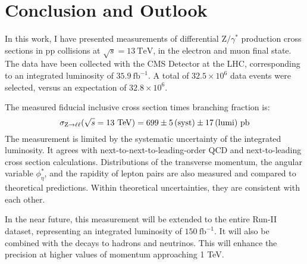 \chapter{Conclusion and Outlook}

In this work, I have presented measurements of differential $\mathrm{Z}/\gamma^{*}$ production cross sections in $\mathrm{p}\mathrm{p}$ collisions at $\sqrt{s}=13~\mathrm{TeV}$,
in the electron and muon final state.
The data have been collected with the CMS Detector at the LHC, corresponding to an integrated luminosity of $35.9~\mathrm{fb}^{-1}$.
A total of $32.5 \times 10^{6}$ data events were selected, versus an expectation of $32.8 \times 10^{6}$.

The measured fiducial inclusive cross section times branching fraction is: 
\begin{equation*}
\sigma_{\mathrm{Z} \to \ell\ell}(\sqrt{s}=13~\mathrm{TeV}) = 699\pm5\,\text{(syst)}\pm17\,\text{(lumi)}~\mathrm{pb}
\end{equation*}
The measurement is limited by the systematic uncertainty of the integrated luminosity.
It agrees with next-to-next-to-leading-order QCD and next-to-leading cross section calculations. 
Distributions of the transverse momentum, the angular variable $\phi^{*}_\eta$, and the rapidity of lepton pairs are also measured and compared to theoretical predictions.
Within theoretical uncertainties, they are consistent with each other.

In the near future, this measurement will be extended to the entire Run-II dataset,
representing an integrated luminosity of $150~\mathrm{fb}^{-1}$.
It will also be combined with the decays to hadrons and neutrinos.
This will enhance the precision at higher values of momentum approaching 1 TeV.

